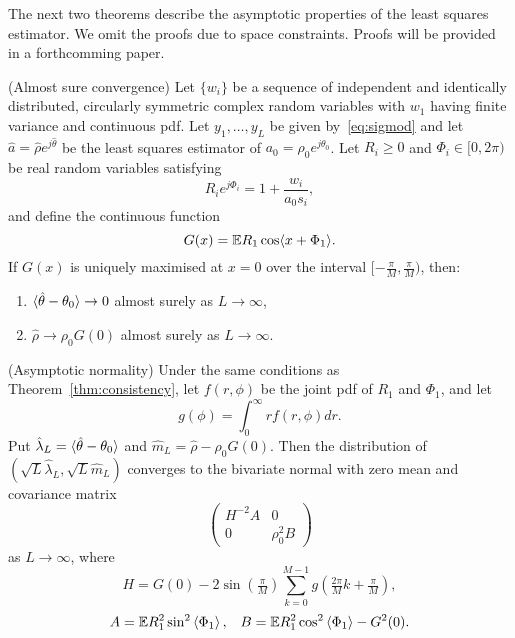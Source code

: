 \documentclass{article}
\begin{document}
The next two theorems describe the asymptotic properties of the least squares estimator.  We omit the proofs due to space constraints.  Proofs will be provided in a forthcomming paper.

\begin{theorem}\label{thm:consistency} (Almost sure convergence)
Let $\{w_i\}$ be a sequence of independent and identically distributed, circularly symmetric complex random variables with $w_1$ having finite variance and continuous pdf.  Let $y_1,\dots, y_L$ be given by~\eqref{eq:sigmod} and let $\hat{a} = \hat{\rho}e^{j\hat{\theta}}$ be the least squares estimator of $a_0 = \rho_0e^{j\theta_0}$.  Let $R_i \geq 0$ and $\Phi_i \in [0,2\pi)$ be real random variables satisfying
\vspace{-0.15cm}
\[
R_ie^{j\Phi_i} = 1 + \frac{w_i}{a_0 s_i},
\]
and define the continuous function
\[
G(x) = {\mathbb E} R_1 \cos\langle  x + \Phi_1 \rangle.
\] 
If $G(x)$ is uniquely maximised at $x = 0$ over the interval $[-\tfrac{\pi}{M},\tfrac{\pi}{M})$, then:
\begin{enumerate}
\item \vspace{-0.15cm} $\langle \hat{\theta} - \theta_0 \rangle \rightarrow 0$ almost surely as $L \rightarrow \infty$,
\item \vspace{-0.2cm} $\hat{\rho} \rightarrow \rho_0 G(0)$ almost surely as $L \rightarrow \infty$.
\end{enumerate}
\end{theorem}

\begin{theorem}\label{thm:normality} (Asymptotic normality)
Under the same conditions as Theorem~\ref{thm:consistency}, let $f(r,\phi)$ be the joint pdf of $R_1$ and $\Phi_1$, and let
\[
g(\phi) = \int_{0}^{\infty} r f(r,\phi) dr.
\]
Put $\hat{\lambda}_L = \langle \hat{\theta} - \theta_0 \rangle$ and $\hat{m}_L = \hat{\rho} - \rho_0 G(0)$. %
Then the distribution of $(\sqrt{L}\hat{\lambda}_L, \sqrt{L}\hat{m}_L)$ converges to the bivariate normal with zero mean and covariance matrix
\[
\left( \begin{array}{cc} 
H^{-2} A & 0 \\
0 & \rho_0^2 B
\end{array} \right)
\]
as $L \rightarrow \infty$, where
\vspace{-0.15cm}
\[
H = G(0) -  2 \sin(\tfrac{\pi}{M}) \sum_{k = 0}^{M-1} g(\tfrac{2\pi}{M}k + \tfrac{\pi}{M}),
\]
\vspace{-0.15cm}
\[
A = {\mathbb E} R_1^2\sin^2\left\langle \Phi_1 \right\rangle, \;\;\; B = {\mathbb E} R_1^2 \cos^2\left\langle \Phi_1 \right\rangle - G^2(0). 
\]
\end{theorem}
\end{document}

